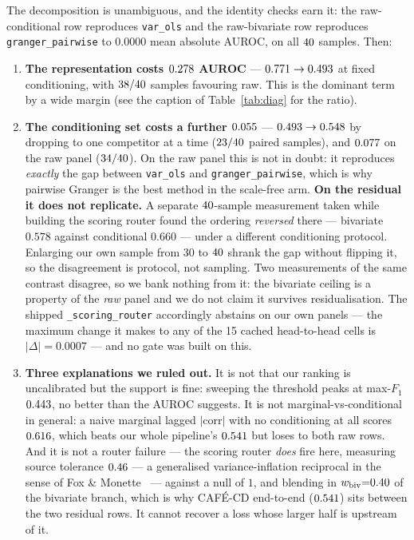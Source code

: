 \documentclass[10pt,twocolumn]{article}
\newcommand{\cafe}{CAF\'E}
\DeclareRobustCommand{\cd}{\cafe{}\nobreakdash-CD}
\begin{document}


The decomposition is unambiguous, and the identity checks earn it: the raw-conditional
row reproduces \texttt{var\_ols} and the raw-bivariate row reproduces
\texttt{granger\_pairwise} to $0.0000$ mean absolute AUROC, on all $40$ samples. Then:

\begin{enumerate}
\item \textbf{The representation costs $0.278$ AUROC} ---
  $0.771\to0.493$ at fixed conditioning, with $38/40$ samples favouring
  raw. This is the dominant term by a wide margin (see the caption of
  Table~\ref{tab:diag} for the ratio).
\item \textbf{The conditioning set costs a further $0.055$} ---
  $0.493\to0.548$ by dropping to one competitor at a time ($23/40$ paired
  samples), and $0.077$ on the raw panel ($34/40$). On the raw panel
  this is not in doubt: it reproduces \emph{exactly} the gap between \texttt{var\_ols}
  and \texttt{granger\_pairwise}, which is why pairwise Granger is the best method in
  the scale-free arm. \textbf{On the residual it does not replicate.} A separate
  $40$-sample measurement taken while building the scoring router found the ordering
  \emph{reversed} there --- bivariate $0.578$ against conditional $0.660$ --- under a
  different conditioning protocol. Enlarging our own sample from 30 to $40$ shrank the
  gap without flipping it, so the disagreement is protocol, not sampling. Two measurements of the same contrast disagree, so we bank nothing from
  it: the bivariate ceiling is a property of the \emph{raw} panel and we do not claim it
  survives residualisation. The shipped \texttt{\_scoring\_router} accordingly abstains
  on our own panels --- the maximum change it makes to any of the 15 cached
  head-to-head cells is $|\Delta|{=}0.0007$ --- and no gate was built on this.
\item \textbf{Three explanations we ruled out.} It is not that our ranking is
  uncalibrated but the support is fine: sweeping the threshold peaks at max-$F_1$
  $0.443$, no better than the AUROC suggests. It is not marginal-vs-conditional in
  general: a naive marginal lagged $|\mathrm{corr}|$ with no conditioning at all scores
  $0.616$, which beats our whole pipeline's $0.541$ but loses to both raw rows. And
  it is not a router failure --- the scoring router \emph{does} fire here, measuring
  source tolerance $0.46$ --- a generalised variance-inflation reciprocal in the
  sense of Fox \& Monette~\cite{foxmonette} --- against a null of $1$, and blending in
  $w_{\mathrm{biv}}{=}0.40$ of the bivariate branch, which is why \cd{} end-to-end
  ($0.541$) sits between the two residual rows. It cannot recover a loss whose larger half is upstream of it.
\end{enumerate}
\end{document}
